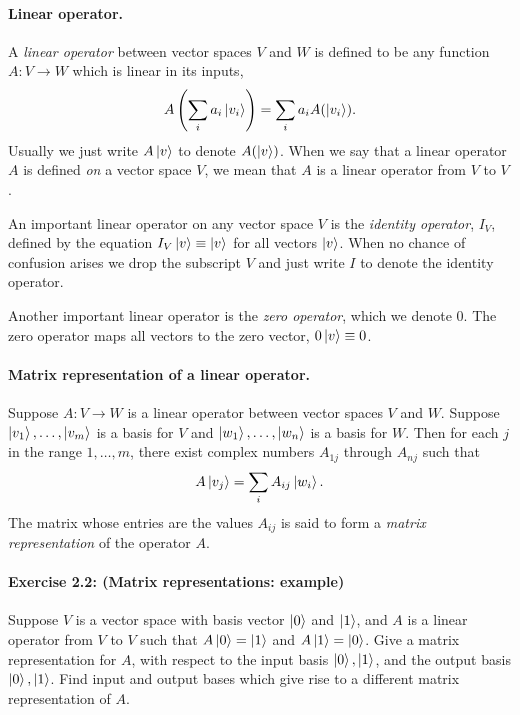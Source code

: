 \documentclass{article}
\begin{document}
\paragraph{Linear operator.} A \emph{linear operator} between vector spaces $V$ and $W$ is defined to be any function $A : V \rightarrow W$ which is linear in its inputs, \begin{equation} \label{eq:lin-op}
  A\left(\sum_i a_i\ket{v_i} \right) = \sum_i a_i A(\ket{v_i}).
\end{equation} Usually we just write $A\ket{v}$ to denote $A(\ket{v})$. When we say that a linear operator $A$ is defined \emph{on} a vector space $V$, we mean that $A$ is a linear operator from $V$ to $V$.

An important linear operator on any vector space $V$ is the \emph{identity operator}, $I_V$, defined by the equation $I_V\ket{v} \equiv \ket{v}$ for all vectors $\ket{v}$. When no chance of confusion arises we drop the subscript $V$ and just write $I$ to denote the identity operator.

Another important linear operator is the \emph{zero operator}, which we denote 0. The zero operator maps all vectors to the zero vector, $0\ket{v} \equiv 0$.

\paragraph{Matrix representation of a linear operator.} Suppose $A : V \rightarrow W$ is a linear operator between vector spaces $V$ and $W$. Suppose $\ket{v_1}, \ldots, \ket{v_m}$ is a basis for $V$ and $\ket{w_1}, \ldots, \ket{w_n}$ is a basis for $W$. Then for each $j$ in the range $1, \ldots, m$, there exist complex numbers $A_{1j}$ through $A_{nj}$ such that \begin{equation}
  A\ket{v_j} = \sum_i A_{ij}\ket{w_i}.
\end{equation}
The matrix whose entries are the values $A_{ij}$ is said to form a \emph{matrix representation} of the operator $A$.

\paragraph{\cite{mikeandike} Exercise 2.2: (Matrix representations: example)} Suppose $V$ is a vector space with basis vector $\ket{0}$ and $\ket{1}$, and $A$ is a linear operator from $V$ to $V$ such that $A\ket{0} = \ket{1}$ and $A\ket{1} = \ket{0}$. Give a matrix representation for $A$, with respect to the input basis $\ket{0}, \ket{1}$, and the output basis $\ket{0}, \ket{1}$. Find input and output bases which give rise to a different matrix representation of $A$.
\end{document}
